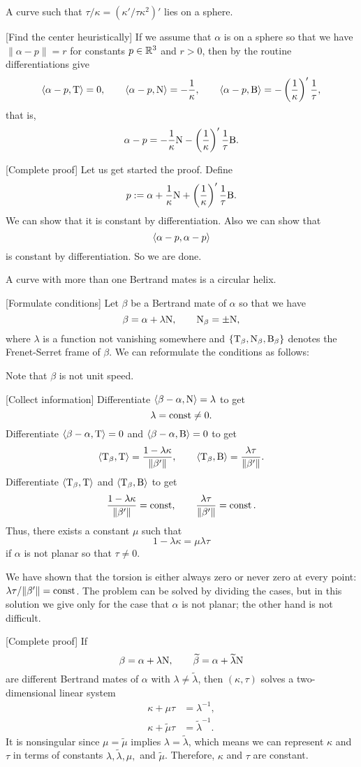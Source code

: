 \documentclass{../note}
\def\a{\alpha}
\begin{document}
\begin{prb}
A curve such that $\tau/\kappa=(\kappa'/\tau\kappa^2)'$ lies on a sphere.
\end{prb}
\begin{sol}
[Find the center heuristically]
If we assume that $\a$ is on a sphere so that we have $\|\a-p\|=r$ for constants $p\in\mathbb{R}^3$ and $r>0$, then by the routine differentiations give
\[\<\a-p,\rT\>=0,\qquad\<\a-p,\rN\>=-\frac1\kappa,\qquad\<\a-p,\rB\>=-\left(\frac1\kappa\right)'\frac1\tau,\]
that is,
\[\a-p=-\frac1\kappa\rN-\left(\frac1\kappa\right)'\frac1\tau\rB.\]

[Complete proof]
Let us get started the proof.
Define
\[p:=\a+\frac1\kappa\rN+\left(\frac1\kappa\right)'\frac1\tau\rB.\]
We can show that it is constant by differentiation.
Also we can show that
\[\<\a-p,\a-p\>\]
is constant by differentiation.
So we are done.
\end{sol}

\begin{prb}
A curve with more than one Bertrand mates is a circular helix.
\end{prb}
\begin{sol}
[Formulate conditions]
Let $\beta$ be a Bertrand mate of $\a$ so that we have
\[\beta=\a+\lambda\rN,\qquad\rN_\beta=\pm\rN,\]
where $\lambda$ is a function not vanishing somewhere and $\{\mathrm{T}_\beta,\mathrm{N}_\beta,\mathrm{B}_\beta\}$ denotes the Frenet-Serret frame of $\beta$.
We can reformulate the conditions as follows:

Note that $\beta$ is not unit speed.

[Collect information]
Differentiate $\<\beta-\a,\rN\>=\lambda$ to get
\[\lambda=\operatorname{const}\ne0.\]
Differentiate $\<\beta-\a,\rT\>=0$ and $\<\beta-\a,\rB\>=0$ to get
\[\langle\mathrm{T}_\beta,\mathrm{T}\rangle=\frac{1-\lambda\kappa}{\|\beta'\|},\qquad\langle\mathrm{T}_\beta,\mathrm{B}\rangle=\frac{\lambda\tau}{\|\beta'\|}.\]
Differentiate $\langle\mathrm{T}_\beta,\mathrm{T}\rangle$ and $\langle\mathrm{T}_\beta,\mathrm{B}\rangle$ to get
\[\frac{1-\lambda\kappa}{\|\beta'\|}=\operatorname{const},\qquad\frac{\lambda\tau}{\|\beta'\|}=\operatorname{const}.\]
Thus, there exists a constant $\mu$ such that
\[1-\lambda\kappa=\mu\lambda\tau\]
if $\a$ is not planar so that $\tau\ne0$.

We have shown that the torsion is either always zero or never zero at every point: $\lambda\tau/\|\beta'\|=\operatorname{const}$.
The problem can be solved by dividing the cases, but in this solution we give only for the case that $\a$ is not planar; the other hand is not difficult.

[Complete proof]
If
\[\beta=\a+\lambda\rN,\qquad\tilde\beta=\a+\tilde\lambda\rN\]
are different Bertrand mates of $\a$ with $\lambda\ne\tilde\lambda$, then $(\kappa,\tau)$ solves a two-dimensional linear system
\begin{align*}
\kappa+\mu\tau&=\lambda^{-1},\\
\kappa+\tilde\mu\tau&=\tilde\lambda^{-1}.
\end{align*}
It is nonsingular since $\mu=\tilde\mu$ implies $\lambda=\tilde\lambda$, which means we can represent $\kappa$ and $\tau$ in terms of constants $\lambda,\tilde\lambda,\mu,$ and $\tilde\mu$.
Therefore, $\kappa$ and $\tau$ are constant.
\end{sol}
\end{document}
